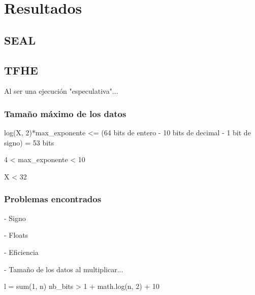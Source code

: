 \chapter{Resultados}

\section{SEAL}



\section{TFHE}

Al ser una ejecución "especulativa"...

\subsection{Tamaño máximo de los datos}

log(X, 2)*max_exponente <= (64 bits de entero - 10 bits de decimal - 1 bit de signo) = 53 bits

4 < max_exponente < 10

X < 32

\subsection{Problemas encontrados}

- Signo

- Floats

- Eficiencia


- Tamaño de los datos al multiplicar...

l = sum(1, n)
nb_bits > 1 + math.log(n, 2) + 10